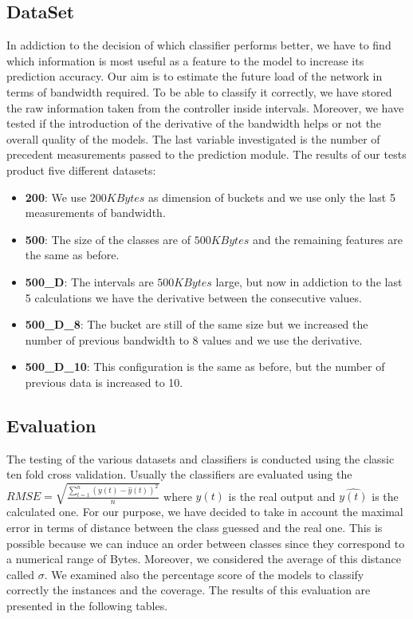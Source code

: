 \documentclass[12pt]{article}
\begin{document}
\subsection{DataSet}
In addiction to the decision of which classifier performs better, we have to find which information is most useful as a feature to the model to increase its prediction accuracy.
Our aim is to estimate the future load of the network in terms of bandwidth required. 
To be able to classify it correctly, we have stored the raw information taken from the controller inside intervals. 
Moreover, we have tested if the introduction of the derivative of the bandwidth helps or not the overall quality of the models.
The last variable investigated is the number of precedent measurements passed to the prediction module.
The results of our tests product five different datasets:
\begin{itemize}
	\item \textbf{200}: We use $200 KBytes$ as dimension of buckets and we use only the last 5 measurements of bandwidth.
	
	\item \textbf{500}: The size of the classes are of $500 KBytes$ and the remaining features are the same as before.
	
	\item \textbf{500\_D}: The intervals are $500 KBytes$ large, but now in addiction to the last 5 calculations we have the derivative between the consecutive values.

	\item \textbf{500\_D\_8}: The bucket are still of the same size but we increased the number of previous bandwidth to 8 values and we use the derivative.
	\item \textbf{500\_D\_10}: This configuration is the same as before, but the number of previous data is increased to 10.
\end{itemize}


\subsection{Evaluation}
The testing of the various datasets and classifiers is conducted using the classic ten fold cross validation.
Usually the classifiers are evaluated using the $RMSE = \sqrt{ \frac{ \sum_{t=1}^{n} (y(t) - \hat{y}(t))^2  }{n}  }$ where $y(t)$ is the real output and $\hat{y(t)}$ is the calculated one.
For our purpose, we have decided to take in account the maximal error in terms of distance between the class guessed and the real one.
This is possible because we can induce an order between classes since they correspond to a numerical range of Bytes. 
Moreover, we considered the average of this distance called $\sigma$.
We examined also the percentage score of the models to classify correctly the instances and the coverage.
The results of this evaluation are presented in the following tables.
\end{document}
